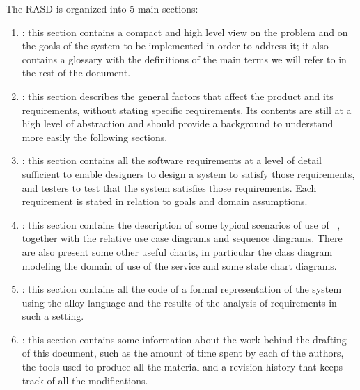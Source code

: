 The RASD is organized into 5 main sections:

\begin{enumerate}
\item {\textbf{}}: this section contains a compact and high level view on the problem and on the goals of the system to be implemented in order to address it; it also contains a glossary with the definitions of the main terms we will refer to in the rest of the document.
\item {\textbf{}}: this section  describes the general factors that affect the product and its requirements, without stating specific requirements. Its contents are still at a high level of abstraction and should provide a background to understand more easily the following sections.
\item {\textbf{}}: this section contains all the software requirements at a level of detail sufficient to enable designers to design a system to satisfy those requirements, and testers to test that the system satisfies those requirements. Each requirement is stated in relation to goals and domain assumptions.
\item {\textbf{}}: this section contains the description of some typical scenarios of use of \projectname~, together with the relative use case diagrams and sequence diagrams. There are also present some other useful charts, in particular the class diagram modeling the domain of use of the service and some state chart diagrams.
\item {\textbf{}}: this section contains all the code of a formal representation of the system using the alloy language and the results of the analysis of requirements in such a setting.
\item {\textbf{}}: this section contains some information about the work behind the drafting of this document, such as the amount of time spent by each of the authors, the tools used to produce all the material and a revision history that keeps track of all the modifications.
\end{enumerate}